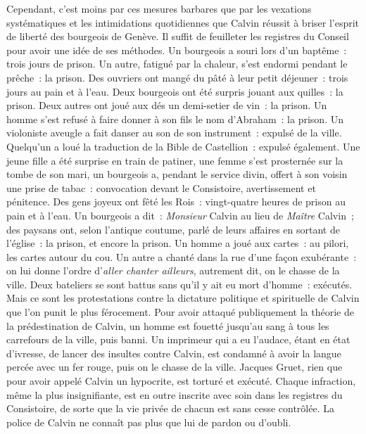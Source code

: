 \documentclass[french,twoside]{book} %
\begin{document}
\noindent Cependant, c’est moins par ces mesures barbares que par les vexations systématiques et les intimidations quotidiennes que Calvin réussit à briser l’esprit de liberté des bourgeois de Genève. Il suffit de feuilleter les registres du Conseil pour avoir une idée de ses méthodes. Un bourgeois a souri lors d’un baptême : trois jours de prison. Un autre, fatigué par la chaleur, s’est endormi pendant le prêche : la prison. Des ouvriers ont mangé du pâté à leur petit déjeuner : trois jours au pain et à l’eau. Deux bourgeois ont été surpris jouant aux quilles : la prison. Deux autres ont joué aux dés un demi-setier de vin : la prison. Un homme s’est refusé à faire donner à son fils le nom d’Abraham : la prison. Un violoniste aveugle a fait danser au son de son instrument : expulsé de la ville. Quelqu’un a loué la traduction de la Bible de Castellion : expulsé également. Une jeune fille a été surprise en train de patiner, une femme s’est prosternée sur la tombe de son mari, un bourgeois a, pendant le service divin, offert à son voisin une prise de tabac : convocation devant le Consistoire, avertissement et pénitence. Des gens joyeux ont fêté les Rois : vingt-quatre heures de prison au pain et à l’eau. Un bourgeois a dit : \emph{Monsieur} Calvin au lieu de \emph{Maître} Calvin ; des paysans ont, selon l’antique coutume, parlé de leurs affaires en sortant de l’église : la prison, et encore la prison. Un homme a joué aux cartes : au pilori, les cartes autour du cou. Un autre a chanté dans la rue d’une façon exubérante : on lui donne l’ordre d’\emph{aller chanter ailleurs}, autrement dit, on le chasse de la ville. Deux bateliers se sont battus sans qu’il y ait eu mort d’homme : exécutés. Mais ce sont les protestations contre la dictature politique et spirituelle de Calvin que l’on punit le plus férocement. Pour avoir attaqué publiquement la théorie de la prédestination de Calvin, un homme est fouetté jusqu’au sang à tous les carrefours de la ville, puis banni. Un imprimeur qui a eu l’audace, étant en état d’ivresse, de lancer des insultes contre Calvin, est condamné à avoir la langue percée avec un fer rouge, puis on le chasse de la ville. Jacques Gruet, rien que pour avoir appelé Calvin un hypocrite, est torturé et exécuté. Chaque infraction, même la plus insignifiante, est en outre inscrite avec soin dans les registres du Consistoire, de sorte que la vie privée de chacun est sans cesse contrôlée. La police de Calvin ne connaît pas plus que lui de pardon ou d’oubli.\par
\end{document}
